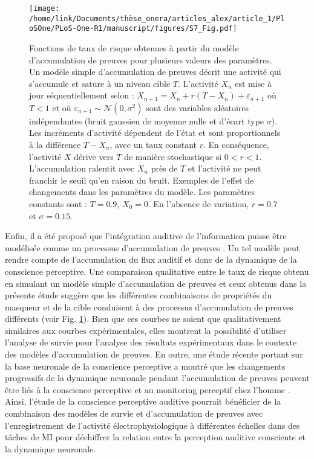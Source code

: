 \begin{figure}[!t]
\texttt{[image: /home/link/Documents/thèse\_onera/articles\_alex/article\_1/PloSOne/PLoS-One-R1/manuscript/figures/S7\_Fig.pdf]}
\caption[Fonctions de taux de risque obtenues à partir du modèle d'accumulation de preuves]{Fonctions de taux de risque obtenues à partir du modèle d'accumulation de preuves pour plusieurs valeurs des paramètres. 
Un modèle simple d'accumulation de preuves \citep{nguyen2020buildup} décrit une activité qui s'accumule et sature à un niveau cible $T$. 
L'activité $X_n$ est mise à jour séquentiellement selon : $X_{n+1} = X_n + r (T-X_n) + \varepsilon_{n+1}$ où $T<1$ et où $\varepsilon_{n+1}\sim\mathcal{N}(0,\sigma^2)$ sont des variables aléatoires indépendantes (bruit gaussien de moyenne nulle et d'écart type $\sigma$). 
Les incréments d'activité dépendent de l'état et sont proportionnels à la différence $T-X_n$, avec un taux constant $r$. 
En conséquence, l'activité $X$ dérive vers $T$ de manière stochastique si $0<r<1$. 
L'accumulation ralentit avec $X_n$ près de $T$ et l'activité ne peut franchir le seuil qu'en raison du bruit. 
Exemples de l'effet de changements dans les paramètres du modèle. 
Les paramètres constants sont : $T=0.9$, $X_0=0$. 
En l'absence de variation, $r=0.7$ et $\sigma=0.15$.}
\label{fig:eva}
\end{figure}

Enfin, il a été proposé que l'intégration auditive de l'information puisse être modélisée comme un processus d'accumulation de preuves \citep{barniv2015auditory, nguyen2020buildup}. 
Un tel modèle peut rendre compte de l'accumulation du flux auditif et donc de la dynamique de la conscience perceptive. 
Une comparaison qualitative entre le taux de risque obtenu en simulant un modèle simple d'accumulation de preuves \citep{nguyen2020buildup} et ceux obtenus dans la présente étude suggère que les différentes combinaisons de propriétés du masqueur et de la cible conduisent à des processus d'accumulation de preuves différents (voir Fig. \ref{fig:eva}). 
Bien que ces courbes ne soient que qualitativement similaires aux courbes expérimentales, elles montrent la possibilité d'utiliser l'analyse de survie pour l'analyse des résultats expérimentaux dans le contexte des modèles d'accumulation de preuves. 
En outre, une étude récente portant sur la base neuronale de la conscience perceptive a montré que les changements progressifs de la dynamique neuronale pendant l'accumulation de preuves peuvent être liés à la conscience perceptive et au monitoring perceptif chez l'homme \citep{pereira2021evidence}. 
Ainsi, l'étude de la conscience perceptive auditive pourrait bénéficier de la combinaison des modèles de survie et d'accumulation de preuves avec l'enregistrement de l'activité électrophysiologique à différentes échelles dans des tâches de MI pour déchiffrer la relation entre la perception auditive consciente et la dynamique neuronale.

